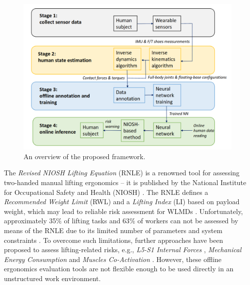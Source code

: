 \begin{figure}[H]
    \centering
    \includegraphics[scale=0.21]{figures/fig_4stages.png}
    \caption{An overview of the proposed framework.}
    \label{fig:general_framework}
\end{figure}

The \emph{Revised NIOSH Lifting Equation} (RNLE) is a renowned 
tool for assessing two-handed manual lifting ergonomics -- it is published by the National Institute for Occupational Safety and Health (NIOSH) \cite{Waters1993, Waters1994}. The RNLE defines a \emph{Recommended Weight Limit} (RWL) and a \emph{Lifting Index} (LI) based on payload weight, which may lead to reliable risk assessment for  
WLMDs \cite{Waters2011}. Unfortunately, approximately 35$\%$ of lifting tasks and 63$\%$ of workers can not be assessed by means of the RNLE due to its limited number of parameters and system constraints \cite{Dempsey2002}. To overcome such limitations, further approaches have been proposed to assess lifting-related risks, e.g., \emph{L5-S1 Internal Forces} \cite{Lavender2003}, \emph{Mechanical Energy Consumption} \cite{Ranavolo2017} and \emph{Muscles Co-Activation} \cite{Ranavolo2015}. However, these offline ergonomics evaluation tools are not flexible enough to be used directly in an unstructured work environment. 

